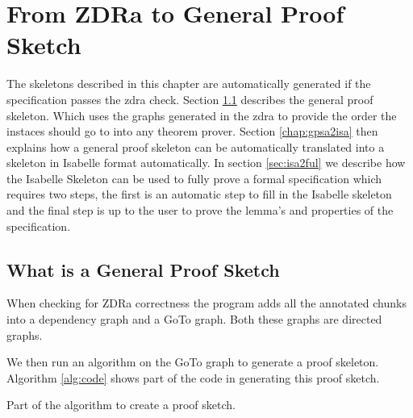 \chapter{From ZDRa to General Proof Sketch}
\label{ch:skeletons}

The skeletons described in this chapter are automatically generated if the specification passes the \gls{zdra} check. Section \ref{sec:zdra2gen} describes the general proof skeleton. Which uses the graphs generated in the \gls{zdra} to provide the order the instaces should go to into any theorem prover. Section \ref{chap:gpsa2isa} then explains how a general proof skeleton can be automatically translated into a skeleton in Isabelle format automatically. In section \ref{sec:isa2ful} we describe how the Isabelle Skeleton can be used to fully prove a formal specification which requires two steps, the first is an automatic step to fill in the Isabelle skeleton and the final step is up to the user to prove the lemma's and properties of the specification.

\section{What is a General Proof Sketch}
\label{sec:zdra2gen}

When checking for ZDRa correctness the program adds all the annotated chunks into a dependency graph and a GoTo graph. Both these graphs are directed graphs.

We then run an algorithm on the GoTo graph to generate a proof skeleton. Algorithm \ref{alg:code} shows part of the code in generating this proof sketch.



\begin{algorithm}[H]
\BlankLine
{}
\caption{Part of the algorithm to create a proof sketch\label{alg:code}.}
\end{algorithm}

